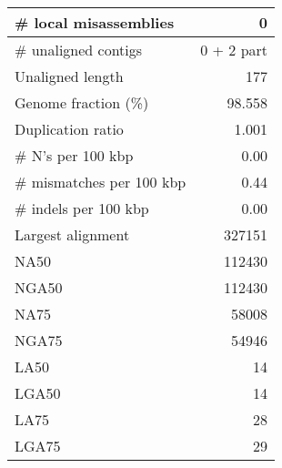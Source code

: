 \documentclass[12pt,a4paper]{article}
\begin{document}
\begin{table}[ht]
\begin{center}
\begin{tabular}{|l*{1}{|r}|}
\# local misassemblies & 0 \\ \hline
\# unaligned contigs & 0 + 2 part \\ \hline
Unaligned length & 177 \\ \hline
Genome fraction (\%) & 98.558 \\ \hline
Duplication ratio & 1.001 \\ \hline
\# N's per 100 kbp & 0.00 \\ \hline
\# mismatches per 100 kbp & 0.44 \\ \hline
\# indels per 100 kbp & 0.00 \\ \hline
Largest alignment & 327151 \\ \hline
NA50 & 112430 \\ \hline
NGA50 & 112430 \\ \hline
NA75 & 58008 \\ \hline
NGA75 & 54946 \\ \hline
LA50 & 14 \\ \hline
LGA50 & 14 \\ \hline
LA75 & 28 \\ \hline
LGA75 & 29 \\ \hline
\end{tabular}
\end{center}
\end{table}
\end{document}
